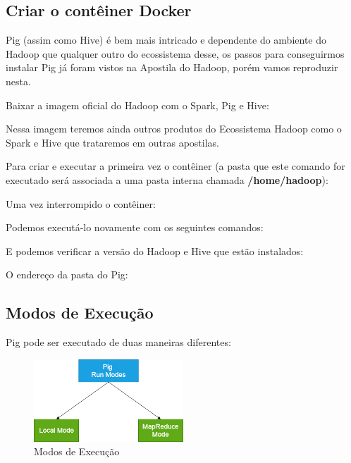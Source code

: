 \documentclass[a4paper,11pt]{article}
\begin{document}
\subsection{Criar o contêiner Docker}
Pig (assim como Hive) é bem mais intricado e dependente do ambiente do Hadoop que qualquer outro do ecossistema desse, os passos para conseguirmos instalar Pig já foram vistos na Apostila do Hadoop, porém vamos reproduzir nesta.

Baixar a imagem oficial do Hadoop com o Spark, Pig e Hive: \\

Nessa imagem teremos ainda outros produtos do Ecossistema Hadoop como o Spark e Hive que trataremos em outras apostilas.

Para criar e executar a primeira vez o contêiner (a pasta que este comando for executado será associada a uma pasta interna chamada \textbf{/home/hadoop}): \\

Uma vez interrompido o contêiner: \\

Podemos executá-lo novamente com os seguintes comandos: \\

E podemos verificar a versão do Hadoop e Hive que estão instalados: \\

O endereço da pasta do Pig: \\

\subsection{Modos de Execução}
Pig pode ser executado de duas maneiras diferentes:
\begin{figure}[H]
	\centering
	\includegraphics[width=0.5\textwidth]{imagem/modos}
	\caption{Modos de Execução}
\end{figure}
\end{document}
